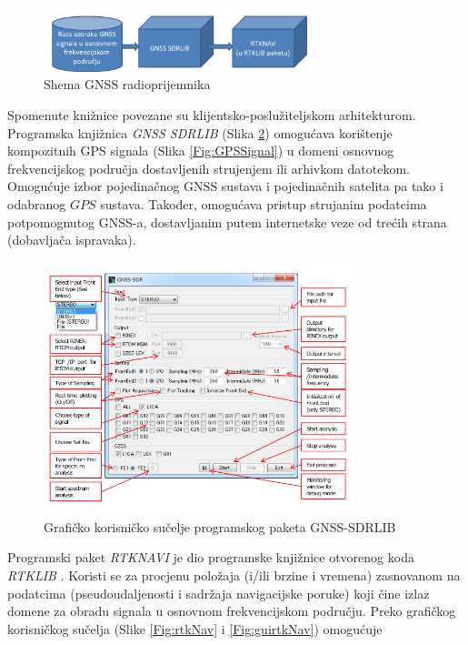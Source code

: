 \documentclass[a4paper,twoside,12pt]{memoir} %
\begin{document}
\begin{figure}[H]
	\centering
	\includegraphics[width=0.7\textwidth]{rtkGNSS}
	\caption{Shema GNSS radioprijemnika}
	\label{Fig:radioprijemnik}	
\end{figure}
Spomenute knižnice povezane su klijentsko-poslužiteljskom arhitekturom.
\vspace{0.5cm}
Programska knjižnica \textit{GNSS SDRLIB} (Slika \ref{Fig:sdrlib}) omogućava korištenje kompozitnih
GPS signala (Slika \ref{Fig:GPSSignal}) u domeni osnovnog  frekvencijskog područja dostavljenih strujenjem
ili arhivkom datotekom.
Omogućuje izbor pojedinačnog GNSS sustava i pojedinačnih satelita pa tako i odabranog $GPS$ sustava.
Također, omogućava pristup strujanim podatcima potpomognutog GNSS-a,  dostavljanim putem internetske veze od trećih strana (dobavljača ispravaka).
\begin{figure}[H]
	\centering
	\includegraphics[width=0.8\textwidth]{sdrlib}
	\caption{Grafičko korisničko sučelje programskog paketa GNSS-SDRLIB}
	\label{Fig:sdrlib}	
\end{figure}
%
Programski paket \textit{RTKNAVI} je dio programske knjižnice otvorenog koda \textit{RTKLIB} \cite{ref:36, ref:5}.
Koristi se za procjenu položaja (i/ili brzine i vremena) zasnovanom na podatcima
(pseudoudaljenosti i sadržaja navigacijske poruke) koji čine izlaz domene za obradu signala u osnovnom
frekvencijskom području. Preko grafičkog korisničkog sučelja (Slike \ref{Fig:rtkNav} i \ref{Fig:guirtkNav}) omogućuje
\end{document}
